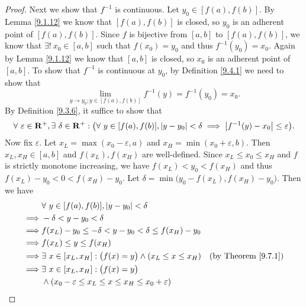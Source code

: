 \begin{proof}
    Next we show that \(f^{-1}\) is continuous.
    Let \(y_0 \in [f(a), f(b)]\).
    By Lemma \ref{9.1.12} we know that \([f(a), f(b)]\) is closed, so \(y_0\) is an adherent point of \([f(a), f(b)]\).
    Since \(f\) is bijective from \([a, b]\) to \([f(a), f(b)]\), we know that \(\exists!\ x_0 \in [a, b]\) such that \(f(x_0) = y_0\) and thus \(f^{-1}(y_0) = x_0\).
    Again by Lemma \ref{9.1.12} we know that \([a, b]\) is closed, so \(x_0\) is an adherent point of \([a, b]\).
    To show that \(f^{-1}\) is continuous at \(y_0\), by Definition \ref{9.4.1} we need to show that
    \[
        \lim_{y \to y_0 ; y \in [f(a), f(b)]} f^{-1}(y) = f^{-1}(y_0) = x_0.
    \]
    By Definition \ref{9.3.6}, it suffice to show that
    \[
        \forall\ \varepsilon \in \mathbf{R}^+, \exists\ \delta \in \mathbf{R}^+ : \big(\forall\ y \in [f(a), f(b)], \abs*{y - y_0} < \delta \implies \abs*{f^{-1}(y) - x_0} \leq \varepsilon\big).
    \]
    Now fix \(\varepsilon\).
    Let \(x_L = \max(x_0 - \varepsilon, a)\) and \(x_H = \min(x_0 + \varepsilon, b)\).
    Then \(x_L, x_H \in [a, b]\) and \(f(x_L), f(x_H)\) are well-defined.
    Since \(x_L \leq x_0 \leq x_H\) and \(f\) is strictly monotone increasing, we have \(f(x_L) < y_0 < f(x_H)\) and thus \(f(x_L) - y_0 < 0 < f(x_H) - y_0\).
    Let \(\delta = \min\big(y_0 - f(x_L), f(x_H) - y_0\big)\).
    Then we have
    \begin{align*}
                 & \forall\ y \in [f(a), f(b)], \abs*{y - y_0} < \delta                                                                                \\
        \implies & -\delta < y - y_0 < \delta                                                                                                          \\
        \implies & f(x_L) - y_0 \leq -\delta < y - y_0 < \delta \leq f(x_H) - y_0                                                                      \\
        \implies & f(x_L) \leq y \leq f(x_H)                                                                                                           \\
        \implies & \exists\ x \in [x_L, x_H] : \big(f(x) = y\big) \land (x_L \leq x \leq x_H)                        & \text{(by Theorem \ref{9.7.1})} \\
        \implies & \exists\ x \in [x_L, x_H] : \big(f(x) = y\big)                                                                                      \\
                 & \land (x_0 - \varepsilon \leq x_L \leq x \leq x_H \leq x_0 + \varepsilon)                                                           \\

\end{align*}
\end{proof}
